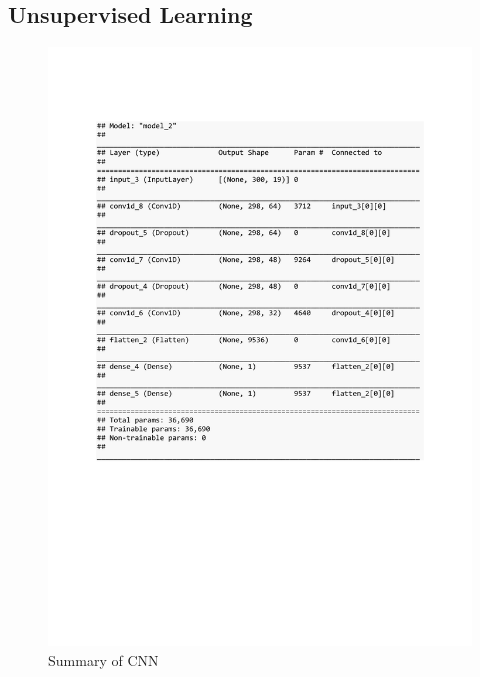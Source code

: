 \subsection{Unsupervised Learning}
\begin{figure}[h]
	\centering
	\includegraphics[scale=0.5]{Figures/summary_CNN_GHL}
	\decoRule
	\caption[Experiment 3: Summary of CNN for unsupervised learning]{Summary of CNN \parencite{own}}
	\label{fig:summary_CNN_GHL}
\end{figure}

